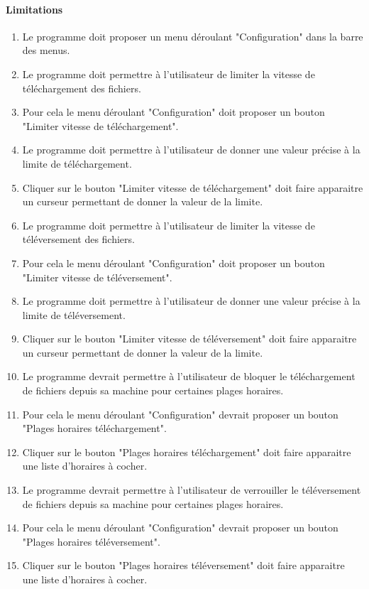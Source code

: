 \documentclass[10pt,a4paper]{report}
\begin{document}
\paragraph{Limitations}
	\begin{enumerate}
		\item Le programme doit proposer un menu déroulant "Configuration" dans la barre des menus.
		\item Le programme doit permettre à l'utilisateur de limiter la vitesse de téléchargement des fichiers.
		\item Pour cela le menu déroulant "Configuration" doit proposer un bouton "Limiter vitesse de téléchargement".
		\item Le programme doit permettre à l'utilisateur de donner une valeur précise à la limite de téléchargement.
		\item Cliquer sur le bouton "Limiter vitesse de téléchargement" doit faire apparaitre un curseur permettant de donner la valeur de la limite.
		\item Le programme doit permettre à l'utilisateur de limiter la vitesse de téléversement des fichiers.
		\item Pour cela le menu déroulant "Configuration" doit proposer un bouton "Limiter vitesse de téléversement".
		\item Le programme doit permettre à l'utilisateur de donner une valeur précise à la limite de téléversement.
		\item Cliquer sur le bouton "Limiter vitesse de téléversement" doit faire apparaitre un curseur permettant de donner la valeur de la limite.
		\item Le programme devrait permettre à l'utilisateur de bloquer le téléchargement de fichiers depuis sa machine pour certaines plages horaires.
		\item Pour cela le menu déroulant "Configuration" devrait proposer un bouton "Plages horaires téléchargement".
		\item Cliquer sur le bouton "Plages horaires téléchargement" doit faire apparaitre une liste d'horaires à cocher.
		\item Le programme devrait permettre à l'utilisateur de verrouiller le téléversement de fichiers depuis sa machine pour certaines plages horaires.
		\item Pour cela le menu déroulant "Configuration" devrait proposer un bouton "Plages horaires téléversement".
		\item Cliquer sur le bouton "Plages horaires téléversement" doit faire apparaitre une liste d'horaires à cocher.
	\end{enumerate}
	
\end{document}
